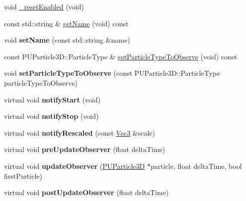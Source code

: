 \begin{DoxyCompactItemize}
\item 
void \hyperlink{classPUObserver_a344fad62cfdc3d670e52f290a0bf20e8}{\+\_\+reset\+Enabled} (void)
\item 
const std\+::string \& \hyperlink{classPUObserver_a733b40d829f215dcbc8b85852e727d6e}{get\+Name} (void) const
\item 
\mbox{\label{classPUObserver_a19d3639b53a6c9afa304558b51e620ba}} 
void {\bfseries set\+Name} (const std\+::string \&name)
\item 
const P\+U\+Particle3\+D\+::\+Particle\+Type \& \hyperlink{classPUObserver_a22aaee1547d3e035806f3b422efcc261}{get\+Particle\+Type\+To\+Observe} (void) const
\item 
\mbox{\label{classPUObserver_a40341090f2b84d50cd56e7571b639345}} 
void {\bfseries set\+Particle\+Type\+To\+Observe} (const P\+U\+Particle3\+D\+::\+Particle\+Type particle\+Type\+To\+Observe)
\item 
\mbox{\label{classPUObserver_afdff79765ddccdc9d6f295f465f5763b}} 
virtual void {\bfseries notify\+Start} (void)
\item 
\mbox{\label{classPUObserver_afb8ce0f27d5640e75fb9c92608160f37}} 
virtual void {\bfseries notify\+Stop} (void)
\item 
\mbox{\label{classPUObserver_aa71ad27d39dc5bc4aacdb0a7bceadf7a}} 
virtual void {\bfseries notify\+Rescaled} (const \hyperlink{classVec3}{Vec3} \&scale)
\item 
\mbox{\label{classPUObserver_aac520854750b811d910da05e19e15fd7}} 
virtual void {\bfseries pre\+Update\+Observer} (float delta\+Time)
\item 
\mbox{\label{classPUObserver_a3a22242b6699dd5e6b822f5684892dbb}} 
virtual void {\bfseries update\+Observer} (\hyperlink{structPUParticle3D}{P\+U\+Particle3D} $\ast$particle, float delta\+Time, bool first\+Particle)
\item 
\mbox{\label{classPUObserver_a4c2fbe1caf88c4e8998dd3a3fb7d656f}} 
virtual void {\bfseries post\+Update\+Observer} (float delta\+Time)
\item 

\end{DoxyCompactItemize}
